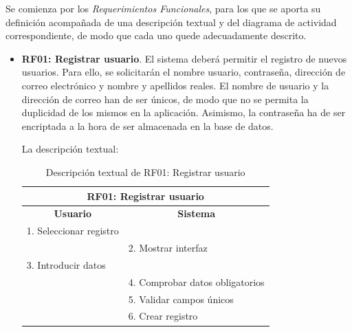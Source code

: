 Se comienza por los \emph{Requerimientos Funcionales}, para los que se aporta su definición acompañada de una descripción textual y del diagrama de actividad correspondiente, de modo que cada uno quede adecuadamente descrito.

\begin{itemize}
	\item \textbf{RF01: Registrar usuario}. El sistema deberá permitir el registro de nuevos usuarios. Para ello, se solicitarán el nombre usuario, contraseña, dirección de correo electrónico y nombre y apellidos reales. El nombre de usuario y la dirección de correo han de ser únicos, de modo que no se permita la duplicidad de los mismos en la aplicación. Asimismo, la contraseña ha de ser encriptada a la hora de ser almacenada en la base de datos.
	
	La descripción textual:
	\begin{table}[h]
		\centering	
		\begin{tabular}{|l|l|}
			\hline
			\multicolumn{2}{|c|}{\textbf{RF01: Registrar usuario}} \\ \hline
			\multicolumn{1}{|c|}{\textbf{Usuario}} & \multicolumn{1}{c|}{\textbf{Sistema}} \\ \hline
			1. Seleccionar registro &\\ \hline
			& 2. Mostrar interfaz \\ \hline
			3. Introducir datos &\\ \hline
			& 4. Comprobar datos obligatorios \\ \hline
			& 5. Validar campos únicos\\ \hline
			& 6. Crear registro \\ \hline
		\end{tabular}
		\caption{Descripción textual de RF01: Registrar usuario}
		\label{tab:tablaDescTextualRF01}
	\end{table}
	

\end{itemize}
